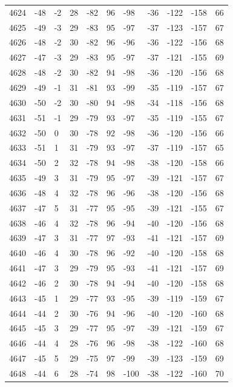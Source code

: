 \begin{table}[H]
\begin{tabular}{lllllllllll}
4624 & -48 & -2 & 28 & -82 & 96 & -98 & -36 & -122 & -158 & 66 \\
4625 & -49 & -3 & 29 & -83 & 95 & -97 & -37 & -123 & -157 & 67 \\
4626 & -48 & -2 & 30 & -82 & 96 & -96 & -36 & -122 & -156 & 68 \\
4627 & -47 & -3 & 29 & -83 & 95 & -97 & -37 & -121 & -155 & 69 \\
4628 & -48 & -2 & 30 & -82 & 94 & -98 & -36 & -120 & -156 & 68 \\
4629 & -49 & -1 & 31 & -81 & 93 & -99 & -35 & -119 & -157 & 67 \\
4630 & -50 & -2 & 30 & -80 & 94 & -98 & -34 & -118 & -156 & 68 \\
4631 & -51 & -1 & 29 & -79 & 93 & -97 & -35 & -119 & -155 & 67 \\
4632 & -50 & 0 & 30 & -78 & 92 & -98 & -36 & -120 & -156 & 66 \\
4633 & -51 & 1 & 31 & -79 & 93 & -97 & -37 & -119 & -157 & 65 \\
4634 & -50 & 2 & 32 & -78 & 94 & -98 & -38 & -120 & -158 & 66 \\
4635 & -49 & 3 & 31 & -79 & 95 & -97 & -39 & -121 & -157 & 67 \\
4636 & -48 & 4 & 32 & -78 & 96 & -96 & -38 & -120 & -156 & 68 \\
4637 & -47 & 5 & 31 & -77 & 95 & -95 & -39 & -121 & -155 & 67 \\
4638 & -46 & 4 & 32 & -78 & 96 & -94 & -40 & -120 & -156 & 68 \\
4639 & -47 & 3 & 31 & -77 & 97 & -93 & -41 & -121 & -157 & 69 \\
4640 & -46 & 4 & 30 & -78 & 96 & -92 & -40 & -120 & -158 & 68 \\
4641 & -47 & 3 & 29 & -79 & 95 & -93 & -41 & -121 & -157 & 69 \\
4642 & -46 & 2 & 30 & -78 & 94 & -94 & -40 & -120 & -158 & 68 \\
4643 & -45 & 1 & 29 & -77 & 93 & -95 & -39 & -119 & -159 & 67 \\
4644 & -44 & 2 & 30 & -76 & 94 & -96 & -40 & -120 & -160 & 68 \\
4645 & -45 & 3 & 29 & -77 & 95 & -97 & -39 & -121 & -159 & 67 \\
4646 & -44 & 4 & 28 & -76 & 96 & -98 & -38 & -122 & -160 & 68 \\
4647 & -45 & 5 & 29 & -75 & 97 & -99 & -39 & -123 & -159 & 69 \\
4648 & -44 & 6 & 28 & -74 & 98 & -100 & -38 & -122 & -160 & 70 \\

\end{tabular}
\end{table}
